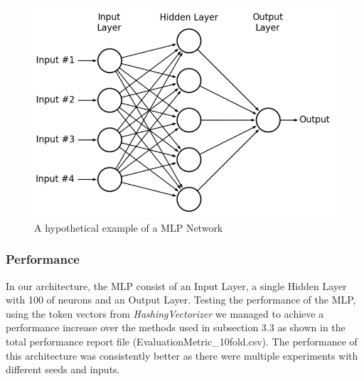 \begin{figure}[h]
\centering
\includegraphics[width=\textwidth]{images/MLP.png}
\caption{A hypothetical example of a MLP Network}
\end{figure}

\subsubsection{Performance}
In our architecture, the MLP consist of an Input Layer, a single Hidden Layer with 100 of neurons and an Output Layer. Testing the performance of the MLP, using the token vectors from \textit{HashingVectorizer} we managed to achieve a performance increase over the methods used in subsection 3.3 as shown in the total performance report file (EvaluationMetric\_10fold.csv). The performance of this architecture was consistently better as there were multiple experiments with different seeds and inputs.